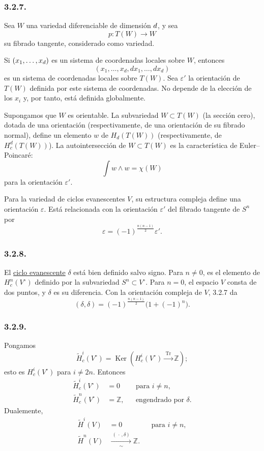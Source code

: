 \subsubsection*{3.2.7.}
Sea $W$ una variedad diferenciable de dimensión $\sisi{x}{d}$, y sea
\[
p:T(W)\longrightarrow W
\]
su fibrado tangente, considerado como variedad.

\pageoriginale

Si $(x_1,\ldots,x_{\sisi{n}{d}})$ es un sistema de coordenadas locales
sobre $W$, entonces
\[
(x_1,\ldots,x_d,dx_1,\ldots,dx_d)
\]
es un sistema de coordenadas locales sobre $T(W)$. Sea $\varepsilon'$
la orientación de $T(W)$ definida por este sistema de coordenadas. No
depende de la elección de los $x_i$ y, por tanto, está definida
globalmente.

Supongamos que $W$ es orientable. La subvariedad $W\subset T(W)$ (la
sección cero), dotada de una orientación (respectivamente, de una
orientación de su fibrado normal), define un elemento $w$ de
$H_d(T(W))$ (respectivamente, de $H_c^d(T(W))$). La autointersección
de $W\subset T(W)$ es la característica de Euler--Poincaré:
\[
\int w\wedge w=\chi(W)
\]
para la orientación $\varepsilon'$.

Para la variedad de ciclos evanescentes $V$, su estructura compleja
define una orientación $\varepsilon$. Está relacionada con la orientación
$\varepsilon'$ del fibrado tangente de $S^n$ por
\[
\varepsilon=(-1)^{\frac{n(n-1)}2}\varepsilon'.
\]

\subsubsection*{3.2.8.}
El \underline{ciclo evanescente} $\delta$ está bien definido salvo signo.
Para $n\ne0$, es el elemento de $H_c^n(V^\circ)$ definido por la
subvariedad $S^n\subset V^\circ$. Para $n=0$, el espacio $V$ consta de
dos puntos, y $\delta$ es su diferencia. Con la orientación compleja de
$V$, 3.2.7 da
\begin{equation}\tag{3.2.8.1}
(\delta,\delta)
=(-1)^{\frac{n(n-1)}2}\bigl(1+(-1)^n\bigr).
\end{equation}

\subsubsection*{3.2.9.}
Pongamos
\[
\widetilde H_c^i(V^\circ)
=\operatorname{Ker}\!\left(
H_c^i(V^\circ)\xrightarrow{\ \operatorname{Tr}\ }\mathbb Z
\right);
\]
esto es $H_c^i(V^\circ)$ para $i\ne2n$. Entonces
\[
\begin{aligned}
\widetilde H_c^i(V^\circ)&=0 &&\text{para }i\ne n,\\
\widetilde H_c^n(V^\circ)&=\mathbb Z,
  &&\text{engendrado por }\delta.
\end{aligned}
\]
Dualemente,
\[
\begin{aligned}
\widetilde H^i(V)&=0 &&\text{para }i\ne n,\\
\widetilde H^n(V)&\xrightarrow[\sim]{\ (\,\cdot\,,\delta)\ }\mathbb Z.
\end{aligned}
\]

